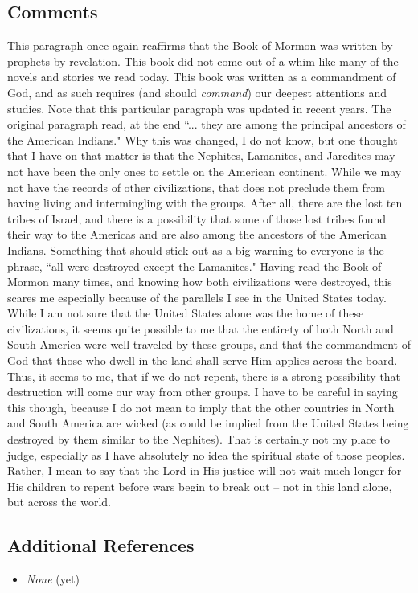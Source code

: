 \documentclass[12pt]{report}
\begin{document}
\subsection{Comments\label{intro:comments2}}
This paragraph once again reaffirms that the Book of Mormon was written by prophets by revelation.  This book did not come out of a whim like many  of the novels and stories we read today.  This book was written as a commandment of God, and as such requires (and should \emph{command}) our deepest attentions and studies.  Note that this particular paragraph was updated in recent years.  The original paragraph read, at the end ``... they are among the principal ancestors of the American Indians."  Why this was changed, I do not know, but one thought that I have on that matter is that the Nephites, Lamanites, and Jaredites may not have been the only ones to settle on the American continent. While we may not have the records of other civilizations, that does not preclude them from having living and intermingling with the groups.  After all, there are the lost ten tribes of Israel, and there is a possibility that some of those lost tribes found their way to the Americas and are also among the ancestors of the American Indians.  Something that should stick out as a big warning to everyone is the phrase, ``all were destroyed except the Lamanites."  Having read the Book of Mormon many times, and knowing how both civilizations were destroyed, this scares me especially because of the parallels I see in the United States today.  While I am not sure that the United States alone was the home of these civilizations, it seems quite possible to me that the entirety of both North and South America were well traveled by these groups, and that the commandment of God that those who dwell in the land shall serve Him applies across the board.  Thus, it seems to me, that if we do not repent, there is a strong possibility that destruction will come our way from other groups.  I have to be careful in saying this though, because I do not mean to imply that the other countries in North and South America are wicked (as could be implied from the United States being destroyed by them similar to the Nephites).  That is certainly not my place to judge, especially as I have absolutely no idea the spiritual state of those peoples.  Rather, I mean to say that the Lord in His justice will not wait much longer for His children to repent before wars begin to break out -- not in this land alone, but across the world.

\subsection{Additional References\label{intro:references2}}
\begin{itemize}
\item \emph{None} (yet)
\end{itemize}
\end{document}
